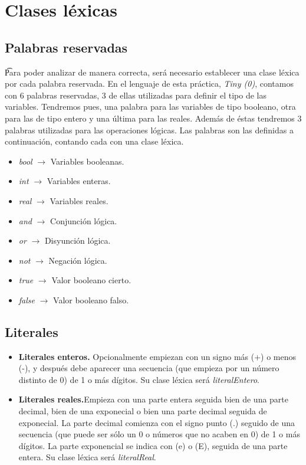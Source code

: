 \section{Clases léxicas}

\subsection{Palabras reservadas}

\t Para poder analizar de manera correcta, será necesario establecer una clase léxica por cada palabra reservada. En el lenguaje de
esta práctica, \textit{Tiny (0)}, contamos con 6 palabras reservadas, 3 de ellas utilizadas para definir el tipo de las variables.
Tendremos pues, una palabra para las variables de tipo booleano, otra para las de tipo entero y una última para las reales. Además
de éstas tendremos 3 palabras utilizadas para las operaciones lógicas. Las palabras son las definidas a continuación, contando cada con
una clase léxica.

\begin{itemize}
    \item \textit{bool} $\rightarrow$ Variables booleanas.
    \item \textit{int} $\rightarrow$ Variables enteras.
    \item \textit{real} $\rightarrow$ Variables reales.
    \item \textit{and} $\rightarrow$ Conjunción lógica.
    \item \textit{or} $\rightarrow$ Disyunción lógica.
    \item \textit{not} $\rightarrow$ Negación lógica.
    \item \textit{true} $\rightarrow$ Valor booleano cierto.
    \item \textit{false} $\rightarrow$ Valor booleano falso.
\end{itemize}

\subsection{Literales}

\begin{itemize}
    \item \textbf{Literales enteros.} Opcionalmente empiezan con un signo más (+) o menos (-), y después debe aparecer una
        secuencia (que empieza por un número distinto de 0) de 1 o más dígitos. Su clase léxica será \textit{literalEntero}.
    \item \textbf{Literales reales.}Empieza con una parte entera seguida bien de una parte decimal, bien de una exponecial o bien una parte decimal seguida de exponecial. La parte decimal comienza con el signo punto (.) seguido de una secuencia (que puede ser sólo un 0 o números que no acaben en 0) de 1 o más dígitos. La parte exponencial se indica con (e) o (E), seguida de una parte entera. Su clase léxica será \textit{literalReal}.
\end{itemize}

